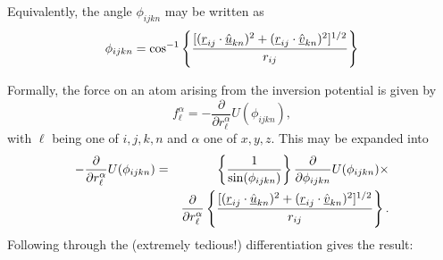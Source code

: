 Equivalently, the angle $\phi_{ijkn}$ may be written as
\begin{equation}
\phi_{ijkn}=\cos^{-1} \left \{ \frac{
[(\mbox{$\underline{r}$}_{ij}\cdot\mbox{$\underline{\hat{u}}$}_{kn})^{2}
+(\mbox{$\underline{r}$}_{ij}\cdot\mbox{$\underline{\hat{v}}$}_{kn})^{2}]^{1/2}}{r_{ij}}\right \}
\end{equation}

Formally, the force on an atom arising from the inversion potential is given by
\begin{equation}
f_{\ell}^{\alpha}=-\frac{\partial}{\partial
r_{\ell}^{\alpha}}U(\phi_{ijkn}),
\end{equation}
with $\ell$ being one of $i,j,k,n$ and $\alpha$ one of $x,y,z$. This
may be expanded into
\begin{eqnarray}
-\frac{\partial}{\partial r_{\ell}^{\alpha}}U(\phi_{ijkn})&=&
\left\{\frac{1}{\sin(\phi_{ijkn})}\right\}
\frac{\partial}{\partial \phi_{ijkn}}U(\phi_{ijkn})\times \nonumber \\
& & \frac{\partial}{\partial r_{\ell}^{\alpha}}
\left\{\frac{[(\mbox{$\underline{r}$}_{ij}\cdot\mbox{$\underline{\hat{u}}$}_{kn})^{2}
+(\mbox{$\underline{r}$}_{ij}\cdot\mbox{$\underline{\hat{v}}$}_{kn})^{2}]^{1/2}}
{r_{ij}}\right \}.
\end{eqnarray}
Following through the (extremely tedious!) differentiation gives the result:
